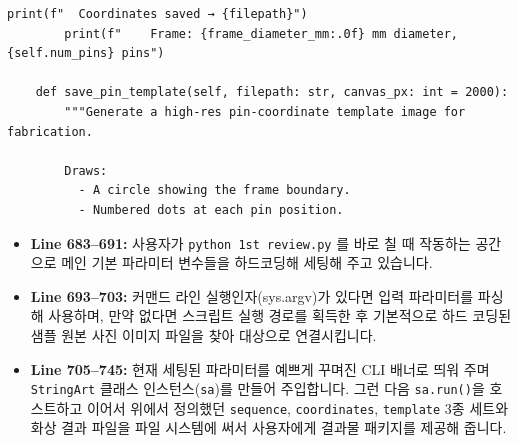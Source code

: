 \begin{lstlisting}[firstnumber=681]
        print(f"  Coordinates saved → {filepath}")
        print(f"    Frame: {frame_diameter_mm:.0f} mm diameter, {self.num_pins} pins")

    def save_pin_template(self, filepath: str, canvas_px: int = 2000):
        """Generate a high-res pin-coordinate template image for fabrication.

        Draws:
          - A circle showing the frame boundary.
          - Numbered dots at each pin position.
\end{lstlisting}
\begin{itemize}
\item \textbf{Line 683--691:} 사용자가 \texttt{python 1st review.py} 를 바로 칠 때 작동하는 공간으로 메인 기본 파라미터 변수들을 하드코딩해 세팅해 주고 있습니다.
\item \textbf{Line 693--703:} 커맨드 라인 실행인자(sys.argv)가 있다면 입력 파라미터를 파싱해 사용하며, 만약 없다면 스크립트 실행 경로를 획득한 후 기본적으로 하드 코딩된 샘플 원본 사진 이미지 파일을 찾아 대상으로 연결시킵니다.
\item \textbf{Line 705--745:} 현재 세팅된 파라미터를 예쁘게 꾸며진 CLI 배너로 띄워 주며 \texttt{StringArt} 클래스 인스턴스(\texttt{sa})를 만들어 주입합니다. 그런 다음 \texttt{sa.run()}을 호스트하고 이어서 위에서 정의했던 \texttt{sequence}, \texttt{coordinates}, \texttt{template} 3종 세트와 화상 결과 파일을 파일 시스템에 써서 사용자에게 결과물 패키지를 제공해 줍니다.
\end{itemize}

